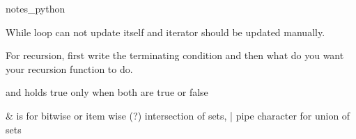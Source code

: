 notes_python

While loop can not update itself and iterator should be updated manually. 

For recursion, first write the terminating condition and then what do you want your recursion function to do. 

and holds true only when both are true or false

& is for bitwise or item wise (?) intersection of sets, | pipe character for union of sets